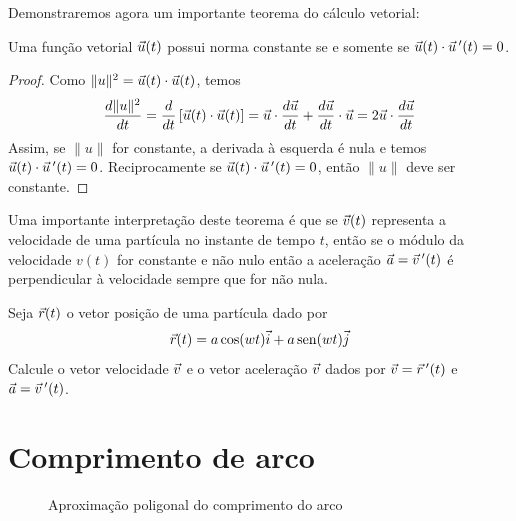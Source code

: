 Demonstraremos agora um importante teorema do cálculo vetorial:
\begin{teo}\label{teodernormacst} Uma função vetorial $\vec{u}(t)$ possui norma constante se e somente se $\vec{u}(t)\cdot\vec{u}\!~'(t)=0$. 
\end{teo}
\begin{proof} Como $\|u\|^2=\vec{u}(t)\cdot\vec{u}(t)$, temos
$$\frac{d \|u\|^2}{dt}=\frac{d}{dt}\left[\vec{u}(t)\cdot\vec{u}(t)\right]=\vec{u}\cdot\frac{d\vec{u}}{dt}+\frac{d\vec{u}}{dt}\cdot\vec{u}=2\vec{u}\cdot\frac{d\vec{u}}{dt}$$
Assim, se $\|u\|$ for constante, a derivada à esquerda é nula e temos $\vec{u}(t)\cdot\vec{u}\!~'(t)=0$. Reciprocamente se $\vec{u}(t)\cdot\vec{u}\!~'(t)=0$, então $\|u\|$ deve ser constante.
\end{proof}
\begin{obs} Uma importante interpretação deste teorema é que se $\vec{v}(t)$ representa a velocidade de uma partícula no instante de tempo $t$, então se o módulo da velocidade $v(t)$ for constante e não nulo então a aceleração $\vec{a}=\vec{v}\!~'(t)$ é perpendicular à velocidade sempre que for não nula.  
\end{obs}




\begin{ex}Seja $\vec{r}(t)$ o vetor posição de uma partícula dado por
$$\vec{r}(t)=a\cos(wt)\vec{i}+a\operatorname{sen}(wt)\vec{j}$$
Calcule o vetor velocidade $\vec{v}$ e o vetor aceleração $\vec{v}$ dados por $\vec{v}=\vec{r}~\!'(t)$ e $\vec{a}=\vec{v}~\!'(t)$.
\end{ex}



 
 \section{Comprimento de arco}
 \begin{figure}\caption{Aproximação poligonal do comprimento do arco}\label{fig_compr_arc}
 \end{figure}

